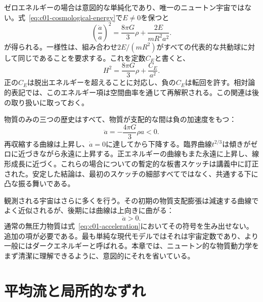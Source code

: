 ゼロエネルギーの場合は意図的な単純化であり、唯一のニュートン宇宙ではない。式~\eqref{eq:c01-cosmological-energy}で\(E\neq0\)を保つと
\begin{equation}
\left(\frac{\dot a}{a}\right)^2
=\frac{8\pi G}{3}\rho+\frac{2E}{mR^2a^2}.
\label{eq:c01-nonzero-energy}
\end{equation}
が得られる。一様性は、組み合わせ\(2E/(mR^2)\)がすべての代表的な共動球に対して同じであることを要求する。これを定数\(C_E\)と書くと、
\begin{equation}
H^2=\frac{8\pi G}{3}\rho+\frac{C_E}{a^2}.
\end{equation}
正の\(C_E\)は脱出エネルギーを超えることに対応し、負の\(C_E\)は転回を許す。相対論的表記では、このエネルギー項は空間曲率を通じて再解釈される。この関連は後の取り扱いに取っておく。

物質のみの三つの歴史はすべて、物質が支配的な間は負の加速度をもつ：
\begin{equation}
\ddot a=-\frac{4\pi G}{3}\rho a<0.
\end{equation}
再収縮する曲線は上昇し、\(\dot a=0\)に達してから下降する。臨界曲線\(t^{2/3}\)は傾きがゼロに近づきながら永遠に上昇する。正エネルギーの曲線もまた永遠に上昇し、線形成長に近づく。これらの場合についての暫定的な板書スケッチは講義中に訂正された。安定した結論は、最初のスケッチの細部すべてではなく、共通する下に凸な振る舞いである。

観測される宇宙はさらに多くを行う。その初期の物質支配膨張は減速する曲線でよく近似されるが、後期には曲線は上向きに曲がる：
\begin{equation}
\ddot a>0.
\end{equation}
通常の無圧力物質は式~\eqref{eq:c01-acceleration}においてその符号を生み出せない。追加の項が必要である。最も単純な現代モデルではそれは宇宙定数であり、より一般にはダークエネルギーと呼ばれる。本章では、ニュートン的な物質動力学をまず清潔に理解できるように、意図的にそれを省いている。

\begin{classroomqa}
\end{classroomqa}

\section{平均流と局所的なずれ}

